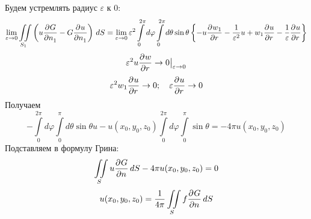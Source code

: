 Будем устремлять радиус $\varepsilon$ к $0$:
\[
	\lim\limits_{\varepsilon \to 0} \iint\limits_{S_1} \left(u \frac{\partial^{}G}{\partial n_1^{}} - G \frac{\partial^{}u}{\partial n_1^{}} \right)\, dS = \lim\limits_{\varepsilon \to 0} \varepsilon^2 \int\limits_0^{2 \pi} d\varphi \int\limits_0^{2 \pi} d \theta \sin \theta \left\{ - u \frac{\partial^{}w_1}{\partial r^{}} - \frac{1}{\varepsilon^2} u + w_1 \frac{\partial^{}u}{\partial r^{}} - \frac{1}{\varepsilon} \frac{\partial^{}u}{\partial r^{}} \right\}
\]
\[
	\varepsilon^2 u \frac{\partial^{}w}{\partial r^{}} \to 0 \big|_{\varepsilon \to 0}
\]
\[
	\varepsilon^2 w_1 \frac{\partial^{}u}{\partial r^{}} \to 0; \quad \varepsilon \frac{\partial^{}u}{\partial r^{}} \to 0
\]
Получаем 
\[
	- \int\limits_0^{2 \pi} d \varphi \int\limits_0^\pi d\theta \sin \theta u - u(x_0, y_0, z_0) \int\limits_0^{2 \pi} d \varphi \int\limits_0^\pi \sin \theta = - 4 \pi u (x_0, y_0, z_0)
\]
Подставляем в формулу Грина:
\[
	\iint\limits_S u \frac{\partial^{}G}{\partial n^{}}\, dS - 4 \pi u (x_0, y_0, z_0) = 0
\]
\[
	u (x_0, y_0, z_0) = \frac{1}{4 \pi} \iint\limits_S f \frac{\partial^{}G}{\partial n^{}}\, dS
\]


